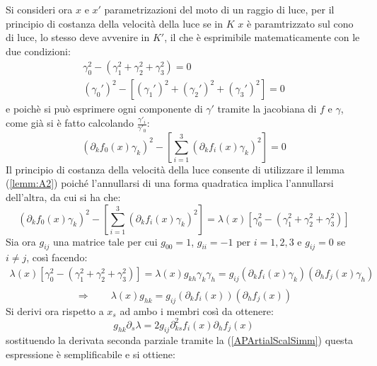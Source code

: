 Si consideri ora $x$ e $x'$ parametrizazioni del moto di un raggio di luce, per il principio di costanza della velocità della luce 
se in $K$ $x$ è paramtrizzato sul cono di luce, lo stesso deve avvenire in $K'$, il che è esprimibile matematicamente con le due condizioni:
\begin{equation*}
    \begin{gathered}
        \gamma_0^2-(\gamma_1^2+\gamma_2^2+\gamma_3^2)=0\\
        (\gamma_0')^2-[(\gamma_1')^2+(\gamma_2')^2+(\gamma_3')^2]=0
    \end{gathered}
\end{equation*}
e poichè si può esprimere ogni componente di $\gamma'$ tramite la jacobiana di $f$ e $\gamma$, come già 
si è fatto calcolando $\frac{\gamma'_i}{\gamma'_0}$:
\begin{equation*}
    \left(\partial_kf_0(x)\gamma_k\right)^2-\left[\sum_{i=1}^3\left(\partial_kf_i(x)\gamma_k\right)^2\right]=0
\end{equation*}
Il principio di costanza della velocità della luce consente di utilizzare il lemma (\ref{lemm:A2}) poiché l'annullarsi di una
 forma quadratica implica l'annullarsi dell'altra, da cui si ha che:
\begin{equation*}
    \left(\partial_kf_0(x)\gamma_k\right)^2-\left[\sum_{i=1}^3\left(\partial_kf_i(x)\gamma_k\right)^2\right]=
    \lambda(x)\left[\gamma_0^2-(\gamma_1^2+\gamma_2^2+\gamma_3^2)\right]
\end{equation*}
Sia ora $g_{ij}$ una matrice tale per cui $g_{00}=1$, $g_{ii}=-1$ per $i=1,2,3$ e $g_{ij}=0$ se $i\neq j$, così facendo:
\begin{equation*}
    \begin{gathered}
        \lambda(x)\left[\gamma_0^2-(\gamma_1^2+\gamma_2^2+\gamma_3^2)\right]= 
        \lambda(x)g_{kh}\gamma_k\gamma_h=g_{ij}(\partial_kf_i(x)\gamma_k)(\partial_hf_j(x)\gamma_h)\\
    \end{gathered}
\end{equation*}
\begin{equation}
   \Rightarrow\qquad \lambda(x)g_{hk}=g_{ij}(\partial_kf_i(x))(\partial_hf_j(x))
    \label{APartialDelta}
\end{equation}
Si derivi ora rispetto a $x_s $ ad ambo i membri così da ottenere:
\begin{equation*}
    g_{hk} \partial_s\lambda =2g_{ij}\partial_{ks}^2f_i(x)\partial_hf_j(x)
\end{equation*}
sostituendo la derivata seconda parziale tramite la (\ref{APArtialScalSimm}) questa espressione è semplificabile e si ottiene:
